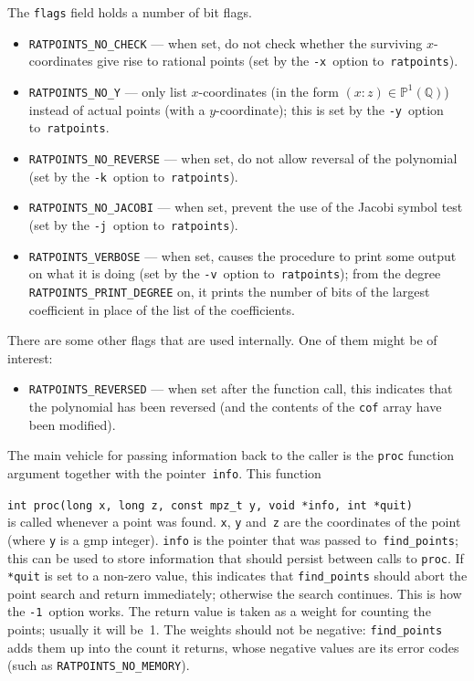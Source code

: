 \documentclass[12pt,a4paper,oneside]{amsart}
\newcommand{\Q}{{\mathbb Q}}
\newcommand{\BP}{{\mathbb P}}
\begin{document}
The \texttt{flags} field holds a number of bit flags.
\begin{itemize}
  \item \texttt{RATPOINTS\_NO\_CHECK} --- when set, do not check whether
        the surviving $x$-coordinates give rise to rational points
        (set by the \verb+-x+~option to~\texttt{ratpoints}).
  \item \texttt{RATPOINTS\_NO\_Y} --- only list $x$-coordinates (in the
        form $(x : z) \in \BP^1(\Q)$) instead of actual points (with
        a $y$-coordinate); this is set by the \verb+-y+~option
        to~\texttt{ratpoints}.
  \item \texttt{RATPOINTS\_NO\_REVERSE} --- when set, do not allow reversal
        of the polynomial (set by the \verb+-k+~option to~\texttt{ratpoints}).
  \item \texttt{RATPOINTS\_NO\_JACOBI} --- when set, prevent the use of the
        Jacobi symbol test (set by the \verb+-j+~option to~\texttt{ratpoints}).
  \item \texttt{RATPOINTS\_VERBOSE} --- when set, causes the procedure to
        print some output on what it is doing (set by the \verb+-v+~option
        to~\texttt{ratpoints}); from the degree
        \texttt{RATPOINTS\_PRINT\_DEGREE} on, it prints the number of bits
        of the largest coefficient in place of the list of the
        coefficients.
\end{itemize}

There are some other flags that are used internally. One of them might be
of interest:
\begin{itemize}
  \item \texttt{RATPOINTS\_REVERSED} --- when set after the function call,
        this indicates that the polynomial has been reversed (and the
        contents of the \texttt{cof} array have been modified).
\end{itemize}

The main vehicle for passing information back to the caller is the
\texttt{proc} function argument together with the pointer~\texttt{info}.
This function \\
\strut\quad\verb+int proc(long x, long z, const mpz_t y, void *info, int *quit)+ \\
is called whenever a point was found. \texttt{x}, \texttt{y} and~\texttt{z} are
the coordinates of the point (where \texttt{y} is a gmp integer).
\texttt{info} is the pointer that was passed to~\texttt{find\_points}; this
can be used to store information that should persist between calls
to \texttt{proc}. If \texttt{*quit} is set to a non-zero value, this indicates
that \texttt{find\_points} should abort the point search and return immediately;
otherwise the search continues. This is how the \verb+-1+~option works.
The return value is taken as a weight
for counting the points; usually it will be~1. The weights should not be
negative: \texttt{find\_points} adds them up into the count it returns,
whose negative values are its error codes (such as
\texttt{RATPOINTS\_NO\_MEMORY}).
\end{document}
